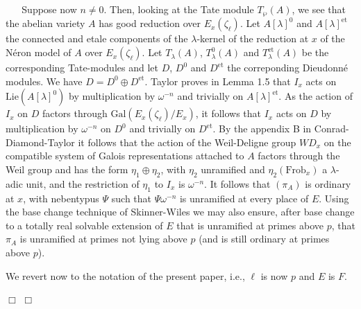 \documentclass[12pt]{article}
\newenvironment{proof}{\smallskip\noindent{\bf Proof.}\
}{$\Box$\smallskip\goodbreak}
\begin{document}
\begin{proof}
\begin{proof}
Suppose now $n\not=0$. Then, looking at the
Tate module $T_{\wp}(A)$, we see that the abelian variety $A$
has good reduction
over $E_x (\zeta_{\ell })$. Let $A[\lambda]^0$ and
$A[\lambda]^{\mathrm{et}}$ the connected and etale components
of the $\lambda$-kernel of the reduction at $x$ of the N\'eron model
of $A$ over $E_x (\zeta_{\ell })$.
Let $T_{\lambda } (A)$,
$T_{\lambda }^0 (A)$
and $T_{\lambda }^{\mathrm{et}} (A)$ be the corresponding Tate-modules and
let $D$, $D^0$ and $D^{\mathrm{et}}$ the correponding Dieudonn\'e modules.
We have $D=D^0 \oplus D^{\mathrm{et}}$.
Taylor proves in  Lemma
1.5 that $I_x$ acts on
$\mathrm{Lie}(A[\lambda]^0 )$ by multiplication by $\omega^{-n}$ and
trivially
on $A[\lambda]^{\mathrm{et}}$.
As the action of $I_x$ on $D$ factors through $\mathrm{Gal}(E_x (\zeta_{\ell
})
/E_x )$,
it follows that $I_x$ acts on $D$ by multiplication
by $\omega^{-n}$ on $D^0$ and trivially on $D^{\mathrm{et}}$.
By the appendix B in Conrad-Diamond-Taylor \cite{CDT} it follows that the
action
of the Weil-Deligne group $WD_x$ on the compatible system
of Galois representations attached to $A$ factors through
the Weil group and has the form $\eta_1\oplus \eta_2$, with
$\eta_2$ unramified and $\eta_2 (\mathrm{Frob}_x )$ a $\lambda$-adic
unit, and the restriction of $\eta_1$ to $I_x$ is $\omega ^{-n}$.
It follows that
$(\pi_A )$ is ordinary at $x$, with nebentypus $\Psi$
such that $\Psi \omega^{-n}$ is unramified
at every place of $E$. Using the base change technique of Skinner-Wiles
\cite{SW1} we may also ensure, after base change to
 a totally real solvable extension of $E$ that is unramified at primes
 above $p$, that $\pi_A$ is unramified at primes
not lying above $p$ (and is still ordinary at primes above $p$).



We revert now to the notation of the present paper, i.e., $\ell$ is now
$p$ and $E$ is $F$.


\end{proof}
\end{proof}
\end{document}
